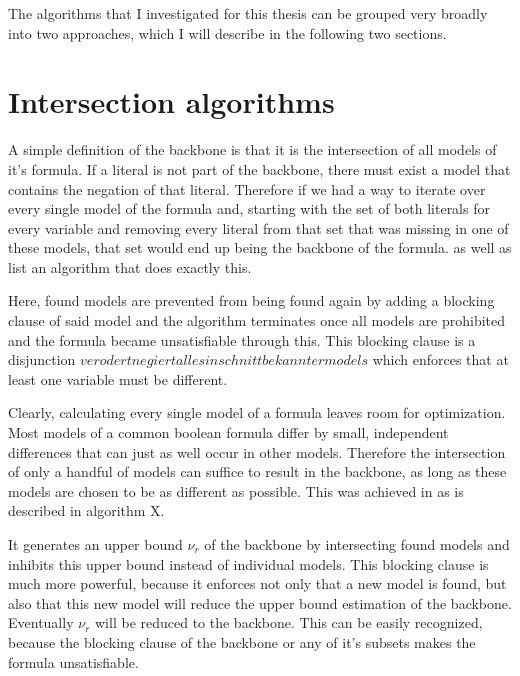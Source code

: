 The algorithms that I investigated for this thesis can be grouped very broadly into two approaches, which I will describe in the following two sections.


\section{Intersection algorithms}
A simple definition of the backbone is that it is the intersection of all models of it's formula. If a literal is not part of the backbone, there must exist a model that contains the negation of that literal. Therefore if we had a way to iterate over every single model of the formula and, starting with the set of both literals for every variable and removing every literal from that set that was missing in one of these models, that set would end up being the backbone of the formula. \cite{mjl10} as well as \cite{mjl15} list an algorithm that does exactly this. 

\begin{algorithm}

\end{algorithm}

Here, found models are prevented from being found again by adding a blocking clause of said model and the algorithm terminates once all models are prohibited and the formula became unsatisfiable through this. This blocking clause is a disjunction $verodert negiert alles in schnitt bekannter models$ which enforces that at least one variable must be different.


Clearly, calculating every single model of a formula leaves room for optimization. Most models of a common boolean formula differ by small, independent differences that can just as well occur in other models. Therefore the intersection of only a handful of models can suffice to result in the backbone, as long as these models are chosen to be as different as possible. This was achieved in \cite{mjl15} as is described in algorithm X.

\begin{algorithm}
\end{algorithm}

It generates an upper bound $\nu_r$ of the backbone by intersecting found models and inhibits this upper bound instead of individual models. This blocking clause is much more powerful, because it enforces not only that a new model is found, but also that this new model will reduce the upper bound estimation of the backbone. 
Eventually $\nu_r$ will be reduced to the backbone. This can be easily recognized, because the blocking clause of the backbone or any of it's subsets makes the formula unsatisfiable.

